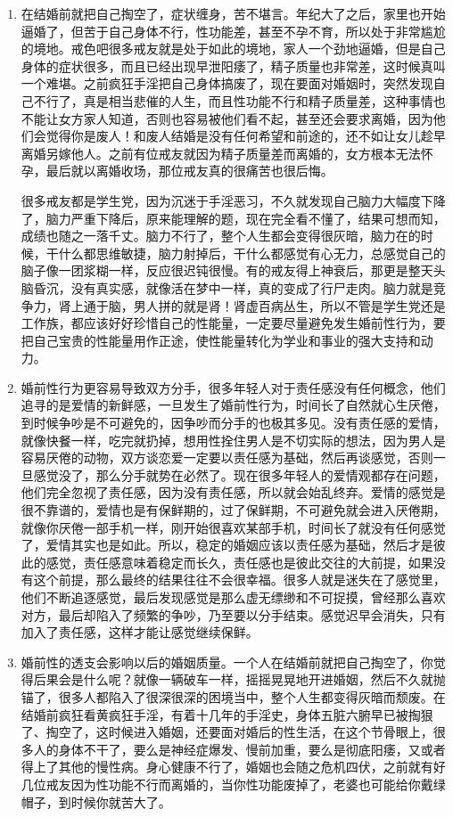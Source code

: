 \documentclass[fontset=founder]{ctexart}
\begin{document}
\begin{enumerate}
    \item 在结婚前就把自己掏空了，症状缠身，苦不堪言。年纪大了之后，家里也开始逼婚了，但苦于自己身体不行，性功能差，甚至不孕不育，所以处于非常尴尬的境地。戒色吧很多戒友就是处于如此的境地，家人一个劲地逼婚，但是自己身体的症状很多，而且已经出现早泄阳痿了，精子质量也非常差，这时候真叫一个难堪。之前疯狂手淫把自己身体搞废了，现在要面对婚姻时，突然发现自己不行了，真是相当悲催的人生，而且性功能不行和精子质量差，这种事情也不能让女方家人知道，否则也容易被他们看不起，甚至还会要求离婚，因为他们会觉得你是废人！和废人结婚是没有任何希望和前途的，还不如让女儿趁早离婚另嫁他人。之前有位戒友就因为精子质量差而离婚的，女方根本无法怀孕，最后就以离婚收场，那位戒友真的很痛苦也很后悔。

          很多戒友都是学生党，因为沉迷于手淫恶习，不久就发现自己脑力大幅度下降了，脑力严重下降后，原来能理解的题，现在完全看不懂了，结果可想而知，成绩也随之一落千丈。脑力不行了，整个人生都会变得很灰暗，脑力在的时候，干什么都思维敏捷，脑力射掉后，干什么都感觉有心无力，总感觉自己的脑子像一团浆糊一样，反应很迟钝很慢。有的戒友得上神衰后，那更是整天头脑昏沉，没有真实感，就像活在梦中一样，真的变成了行尸走肉。脑力就是竞争力，肾上通于脑，男人拼的就是肾！肾虚百病丛生，所以不管是学生党还是工作族，都应该好好珍惜自己的性能量，一定要尽量避免发生婚前性行为，要把自己宝贵的性能量用作正途，使性能量转化为学业和事业的强大支持和动力。
    \item 婚前性行为更容易导致双方分手，很多年轻人对于责任感没有任何概念，他们追寻的是爱情的新鲜感，一旦发生了婚前性行为，时间长了自然就心生厌倦，到时候争吵是不可避免的，因争吵而分手的也极其多见。没有责任感的爱情，就像快餐一样，吃完就扔掉，想用性拴住男人是不切实际的想法，因为男人是容易厌倦的动物，双方谈恋爱一定要以责任感为基础，然后再谈感觉，否则一旦感觉没了，那么分手就势在必然了。现在很多年轻人的爱情观都存在问题，他们完全忽视了责任感，因为没有责任感，所以就会始乱终弃。爱情的感觉是很不靠谱的，爱情也是有保鲜期的，过了保鲜期，不可避免就会进入厌倦期，就像你厌倦一部手机一样，刚开始很喜欢某部手机，时间长了就没有任何感觉了，爱情其实也是如此。所以，稳定的婚姻应该以责任感为基础，然后才是彼此的感觉，责任感意味着稳定而长久，责任感也是彼此交往的大前提，如果没有这个前提，那么最终的结果往往不会很幸福。很多人就是迷失在了感觉里，他们不断追逐感觉，最后发现感觉是那么虚无缥缈和不可捉摸，曾经那么喜欢对方，最后却陷入了频繁的争吵，乃至要以分手结束。感觉迟早会消失，只有加入了责任感，这样才能让感觉继续保鲜。
    \item 婚前性的透支会影响以后的婚姻质量。一个人在结婚前就把自己掏空了，你觉得后果会是什么呢？就像一辆破车一样，摇摇晃晃地开进婚姻，然后不久就抛锚了，很多人都陷入了很深很深的困境当中，整个人生都变得灰暗而颓废。在结婚前疯狂看黄疯狂手淫，有着十几年的手淫史，身体五脏六腑早已被掏狠了、掏空了，这时候进入婚姻，还要面对婚后的性生活，在这个节骨眼上，很多人的身体不干了，要么是神经症爆发、慢前加重，要么是彻底阳痿，又或者得上了其他的慢性病。身心健康不行了，婚姻也会随之危机四伏，之前就有好几位戒友因为性功能不行而离婚的，当你性功能废掉了，老婆也可能给你戴绿帽子，到时候你就苦大了。

\end{enumerate}
\end{document}
